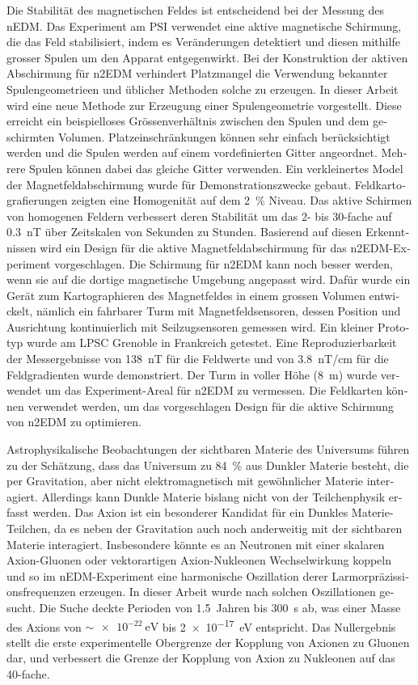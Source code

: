 \begin{otherlanguage}{ngerman}
Die Stabilität des magnetischen Feldes ist entscheidend bei der Messung des nEDM\@.
Das Experiment am PSI verwendet eine aktive magnetische Schirmung, die das Feld stabilisiert, indem es Veränderungen detektiert und diesen mithilfe grosser Spulen um den Apparat entgegenwirkt.
Bei der Konstruktion der aktiven Abschirmung für n2EDM verhindert Platzmangel die Verwendung bekannter Spulengeometrieen und üblicher Methoden solche zu erzeugen.
In dieser Arbeit wird eine neue Methode zur Erzeugung einer Spulengeometrie vorgestellt. Diese erreicht ein beispielloses Grössenverhältnis zwischen den Spulen und dem geschirmten Volumen.
Platzeinschränkungen können sehr einfach berücksichtigt werden und die Spulen werden auf einem vordefinierten Gitter angeordnet. Mehrere Spulen können dabei das gleiche Gitter verwenden.
Ein verkleinertes Model der Magnetfeldabschirmung wurde für Demonstrationszwecke gebaut. Feldkartografierungen zeigten eine Homogenität auf dem \SI{2}{\percent} Niveau.
Das aktive Schirmen von homogenen Feldern verbessert deren Stabilität um das 2- bis 30-fache auf \SI{0.3}{nT} über  Zeitskalen von Sekunden zu Stunden.
Basierend auf diesen Erkenntnissen wird ein Design für die aktive Magnetfeldabschirmung für das n2EDM-Experiment vorgeschlagen.
Die Schirmung für n2EDM kann noch besser werden, wenn sie auf die dortige magnetische Umgebung angepasst wird.
Dafür wurde ein Gerät zum Kartographieren des Magnetfeldes in einem grossen Volumen entwickelt, nämlich ein fahrbarer Turm mit Magnetfeldsensoren, dessen Position und Ausrichtung kontinuierlich mit Seilzugsensoren gemessen wird.
Ein kleiner Prototyp wurde am LPSC Grenoble in Frankreich getestet. Eine Reproduzierbarkeit der Messergebnisse von \SI{138}{nT} für die Feldwerte und von \SI{3.8}{nT/cm} für die Feldgradienten wurde demonstriert.
Der Turm in voller Höhe  (\SI{8}{m}) wurde verwendet um das Experiment-Areal für n2EDM zu vermessen.
Die Feldkarten können verwendet werden, um das vorgeschlagen Design für die aktive Schirmung von n2EDM zu optimieren.

Astrophysikalische Beobachtungen der sichtbaren Materie des Universums führen zu der Schätzung, dass das Universum zu \SI{84}{\percent} aus Dunkler Materie besteht, die  per Gravitation, aber nicht elektromagnetisch mit gewöhnlicher Materie interagiert.
Allerdings kann Dunkle Materie bislang nicht von der Teilchenphysik erfasst werden.
Das Axion ist ein besonderer Kandidat für ein Dunkles Materie-Teilchen, da es neben der Gravitation auch noch anderweitig mit der sichtbaren Materie interagiert.
Insbesondere könnte es an Neutronen mit einer skalaren Axion-Gluonen oder vektorartigen Axion-Nukleonen Wechselwirkung koppeln und so im nEDM-Experiment eine harmonische Oszillation derer Larmorpräzissionsfrequenzen erzeugen.
In dieser Arbeit wurde nach solchen Oszillationen gesucht.
Die Suche deckte Perioden von \SI{1.5}{Jahren} bis \SI{300}{\second} ab, was einer Masse des Axions von $\sim \SI{e-22}{\electronvolt}$ bis \SI{2e-17}{\electronvolt} entspricht.
Das Nullergebnis stellt die erste experimentelle Obergrenze der Kopplung von Axionen zu Gluonen dar, und verbessert die Grenze der Kopplung von Axion zu Nukleonen auf das 40-fache.

\end{otherlanguage}

\endgroup

\vfill
